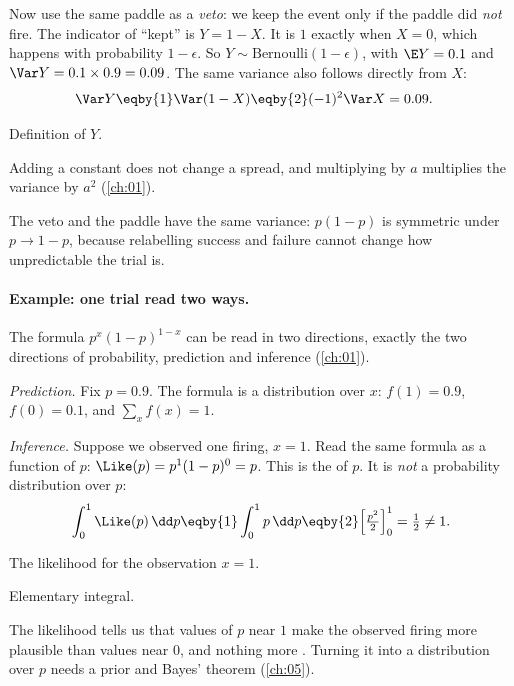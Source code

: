 Now use the same paddle as a \emph{veto}: we keep the event only if the paddle did \emph{not} fire. The indicator of ``kept'' is $Y=1-X$. It is $1$ exactly when $X=0$, which happens with probability $1-\epsilon$. So $Y\sim\mathrm{Bernoulli}(1-\epsilon)$, with $\E Y=0.1$ and $\Var Y=0.1\times0.9=0.09$. The same variance also follows directly from $X$:
\begin{align*}
  \Var Y &\eqby{1} \Var(1-X) \eqby{2} (-1)^2\Var X = 0.09 .
\end{align*}
\begin{explain}
  \item Definition of $Y$.
  \item Adding a constant does not change a spread, and multiplying by $a$ multiplies the variance by $a^2$ (\cref{ch:01}).
\end{explain}
The veto and the paddle have the same variance: $p(1-p)$ is symmetric under $p\to1-p$, because relabelling success and failure cannot change how unpredictable the trial is.

\paragraph{Example: one trial read two ways.}
The formula $p^x(1-p)^{1-x}$ can be read in two directions, exactly the two directions of probability, prediction and inference (\cref{ch:01}).

\emph{Prediction.} Fix $p=0.9$. The formula is a distribution over $x$: $f(1)=0.9$, $f(0)=0.1$, and $\sum_x f(x)=1$.

\emph{Inference.} Suppose we observed one firing, $x=1$. Read the same formula as a function of $p$: $\Like(p)=p^1(1-p)^0=p$. This is the  of $p$. It is \emph{not} a probability distribution over $p$:
\begin{align*}
  \int_0^1 \Like(p)\,\dd p \eqby{1} \int_0^1 p\,\dd p \eqby{2} \Bigl[\tfrac{p^2}{2}\Bigr]_0^1 = \tfrac12 \neq 1 .
\end{align*}
\begin{explain}
  \item The likelihood for the observation $x=1$.
  \item Elementary integral.
\end{explain}
The likelihood tells us that values of $p$ near $1$ make the observed firing more plausible than values near $0$, and nothing more . Turning it into a distribution over $p$ needs a prior and Bayes' theorem (\cref{ch:05}).

